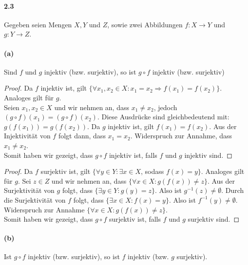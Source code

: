 \documentclass[12pt, letterpaper]{article}
\begin{document}
\paragraph{2.3} Gegeben seien Mengen $X, Y$ und $Z$, sowie zwei Abbildungen $f: X \to Y$ und $g: Y \to Z$. 

\paragraph{(a)} Sind $f$ und $g$ injektiv (bzw. surjektiv), so ist $g \circ f$ injektiv (bzw. surjektiv)\\

\begin{proof}

\noindent Da $f$ injektiv ist, gilt $\{\forall x_1, x_2 \in X: x_1 = x_2 \Rightarrow f(x_1) = f(x_2)\}$. Analoges gilt für $g$.\\

\noindent Seien $x_1, x_2 \in X$ und wir nehmen an, dass $x_1 \neq x_2$, jedoch $(g \circ f)(x_1) = (g \circ f)(x_2)$. Diese Ausdrücke sind gleichbedeutend mit: $g(f(x_1)) = g(f(x_2))$. Da $g$ injektiv ist, gilt $f(x_1) = f(x_2)$. Aus der Injektivität von $f$ folgt dann, dass $x_1 = x_2$. Widerspruch zur Annahme, dass $x_1 \neq x_2$.\\

\noindent Somit haben wir gezeigt, dass $g \circ f$ injektiv ist, falls $f$ und $g$ injektiv sind.

\end{proof}

\begin{proof}

\noindent Da $f$ surjektiv ist, gilt $\{\forall y \in Y: \exists x \in X$, sodass $f(x) = y\}$. Analoges gilt für $g$. Sei $z \in Z$ und wir nehmen an, dass $\{\forall x \in X: g(f(x)) \neq z\}$.
Aus der Surjektivität von $g$ folgt, dass $\{\exists y \in Y: g(y) = z\}$. Also ist $g^{-1}(z) \neq \emptyset$. Durch die Surjektivität von $f$ folgt, dass $\{\exists x \in X: f(x) = y\}$. Also ist $f^{-1}(y) \neq \emptyset$. Widerspruch zur Annahme $\{\forall x \in X: g(f(x)) \neq z\}$.\\

\noindent Somit haben wir gezeigt, dass $g \circ f$ surjektiv ist, falls $f$ und $g$ surjektiv sind.

\end{proof}

\paragraph{(b)} Ist $g \circ f$ injektiv (bzw. surjektiv), so ist $f$ injektiv (bzw. $g$ surjektiv).
\end{document}
